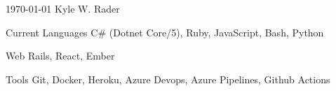 \documentclass[11pt, a4paper]{awesome-cv}
\begin{document}
\makecvheader

\makecvfooter
  {\today}
  {Kyle W. Rader}
  {\thepage}

\begin{cvskills}
  \cvskill
    {Current Languages} %
    {C\# (Dotnet Core/5), Ruby, JavaScript, Bash, Python} %

  \cvskill
    {Web} %
    {Rails, React, Ember} %

  \cvskill
    {Tools} %
    {Git, Docker, Heroku, Azure Devops, Azure Pipelines, Github Actions} %
\end{cvskills}
\end{document}
